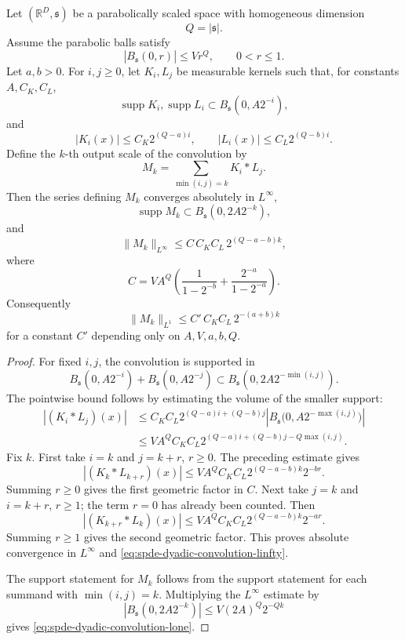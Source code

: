 \begin{lemma}
\label{lem:spde-dyadic-parabolic-convolution-bound}
Let \((\mathbb R^D,\mathfrak s)\) be a parabolically scaled space with
homogeneous dimension
\[
  Q=|\mathfrak s|.
\]
Assume the parabolic balls satisfy
\[
  |B_{\mathfrak s}(0,r)|\leq V r^Q,\qquad 0<r\leq1 .
\]
Let \(a,b>0\).  For \(i,j\geq0\), let \(K_i,L_j\) be measurable kernels
such that, for constants \(A,C_K,C_L\),
\[
  \operatorname{supp}K_i,\operatorname{supp}L_i
  \subset B_{\mathfrak s}(0,A2^{-i}),
\]
and
\[
  |K_i(x)|\leq C_K2^{(Q-a)i},
  \qquad
  |L_i(x)|\leq C_L2^{(Q-b)i}.
\]
Define the \(k\)-th output scale of the convolution by
\[
  M_k=\sum_{\min(i,j)=k}K_i\ast L_j .
\]
Then the series defining \(M_k\) converges absolutely in \(L^\infty\),
\[
  \operatorname{supp}M_k\subset B_{\mathfrak s}(0,2A2^{-k}),
\]
and
\begin{equation}
  \|M_k\|_{L^\infty}
  \leq
  C\,C_KC_L\,2^{(Q-a-b)k},
  \label{eq:spde-dyadic-convolution-linfty}
\end{equation}
where
\[
  C=V A^Q
  \left(
    \frac{1}{1-2^{-b}}
    +
    \frac{2^{-a}}{1-2^{-a}}
  \right).
\]
Consequently
\begin{equation}
  \|M_k\|_{L^1}
  \leq
  C'\,C_KC_L\,2^{-(a+b)k}
  \label{eq:spde-dyadic-convolution-lone}
\end{equation}
for a constant \(C'\) depending only on \(A,V,a,b,Q\).
\end{lemma}

\begin{proof}
For fixed \(i,j\), the convolution is supported in
\[
  B_{\mathfrak s}(0,A2^{-i})+B_{\mathfrak s}(0,A2^{-j})
  \subset
  B_{\mathfrak s}(0,2A2^{-\min(i,j)}).
\]
The pointwise bound follows by estimating the volume of the smaller support:
\[
\begin{aligned}
  |(K_i\ast L_j)(x)|
  &\leq
  C_KC_L
  2^{(Q-a)i+(Q-b)j}
  \left|B_{\mathfrak s}\bigl(0,A2^{-\max(i,j)}\bigr)\right|        \\
  &\leq
  V A^Q C_KC_L
  2^{(Q-a)i+(Q-b)j-Q\max(i,j)} .
\end{aligned}
\]
Fix \(k\).  First take \(i=k\) and \(j=k+r\), \(r\geq0\).  The preceding
estimate gives
\[
  |(K_k\ast L_{k+r})(x)|
  \leq
  V A^Q C_KC_L
  2^{(Q-a-b)k}2^{-br}.
\]
Summing \(r\geq0\) gives the first geometric factor in \(C\).  Next take
\(j=k\) and \(i=k+r\), \(r\geq1\); the term \(r=0\) has already been counted.
Then
\[
  |(K_{k+r}\ast L_k)(x)|
  \leq
  V A^Q C_KC_L
  2^{(Q-a-b)k}2^{-ar}.
\]
Summing \(r\geq1\) gives the second geometric factor.  This proves absolute
convergence in \(L^\infty\) and
\eqref{eq:spde-dyadic-convolution-linfty}.

The support statement for \(M_k\) follows from the support statement for each
summand with \(\min(i,j)=k\).  Multiplying the
\(L^\infty\) estimate by
\[
  |B_{\mathfrak s}(0,2A2^{-k})|
  \leq
  V(2A)^Q2^{-Qk}
\]
gives \eqref{eq:spde-dyadic-convolution-lone}.
\end{proof}

